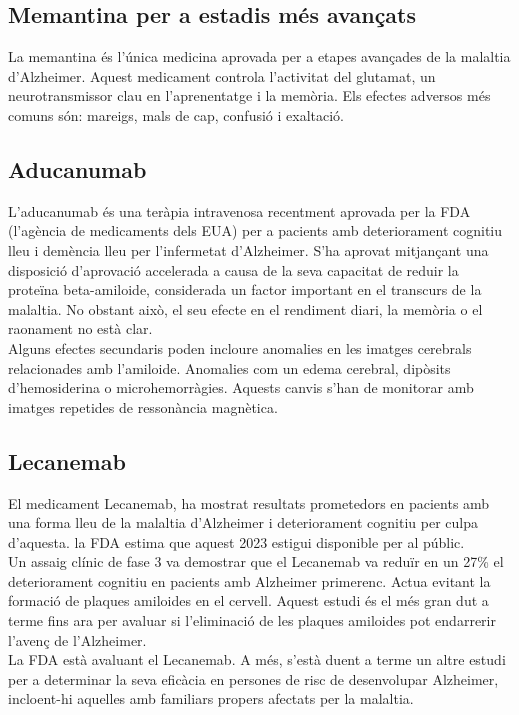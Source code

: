 \documentclass[a4paper,12pt]{report}
\begin{document}
\subsection*{Memantina per a estadis més avançats}
La memantina és l'única medicina aprovada per a etapes avançades de la malaltia d'Alzheimer. Aquest medicament controla l'activitat del glutamat, un neurotransmissor clau en l'aprenentatge i la memòria. Els efectes adversos més comuns són: mareigs, mals de cap, confusió i exaltació.
\subsection*{Aducanumab}
L'aducanumab és una teràpia intravenosa recentment aprovada per la FDA (l'agència de medicaments dels EUA) per a pacients amb deteriorament cognitiu lleu i demència lleu per l'infermetat d'Alzheimer. S'ha aprovat mitjançant una disposició d'aprovació accelerada a causa de la seva capacitat de reduir la proteïna beta-amiloide, considerada un factor important en el transcurs de la malaltia. No obstant això, el seu efecte en el rendiment diari, la memòria o el raonament no està clar.\\
Alguns efectes secundaris poden incloure anomalies en les imatges cerebrals relacionades amb l'amiloide. Anomalies com un edema cerebral, dipòsits  d'hemosiderina o microhemorràgies. Aquests canvis s'han de monitorar amb imatges repetides de ressonància magnètica.
\subsection*{Lecanemab}
El medicament Lecanemab, ha mostrat resultats prometedors en pacients amb una forma lleu de la malaltia d'Alzheimer i deteriorament cognitiu per culpa d'aquesta. la FDA estima que aquest 2023 estigui disponible per al públic.\\
Un assaig clínic de fase 3 va demostrar que el Lecanemab va reduïr en un 27\% el deteriorament cognitiu en pacients amb Alzheimer primerenc. Actua evitant la formació de plaques amiloides en el cervell. Aquest estudi és el més gran dut a terme fins ara per avaluar si l'eliminació de les plaques amiloides pot endarrerir l'avenç de l'Alzheimer.\\
La FDA està avaluant el Lecanemab. A més, s'està duent a terme un altre estudi per a determinar la seva eficàcia en persones de risc de desenvolupar Alzheimer, incloent-hi aquelles amb familiars propers afectats per la malaltia.
\end{document}
